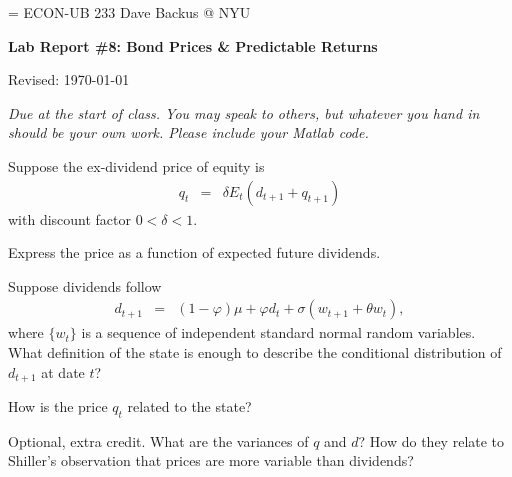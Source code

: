 \documentclass[11pt]{exam}
\begin{document}
\parskip=\bigskipamount
\parindent=0.0in
\thispagestyle{empty}
{\large ECON-UB 233 \hfill Dave Backus @ NYU}

\bigskip\bigskip
\centerline{\Large \bf Lab Report \#8:  Bond Prices \& Predictable Returns}
\centerline{Revised: \today}

\bigskip
{\it Due at the start of class.
You may speak to others, but whatever you hand in should be your own work.
Please include your Matlab code.}


\begin{questions}
Suppose the ex-dividend price of equity is
\begin{eqnarray}
    q_t &=& \delta E_t \left( d_{t+1} + q_{t+1} \right)
    \label{eq:forward}
\end{eqnarray}
with discount factor $ 0 < \delta < 1 $.
\begin{parts}
\item Express the price as a function of expected future dividends.
\item Suppose dividends follow
\begin{eqnarray*}
    d_{t+1} &=& (1-\varphi) \mu + \varphi d_t + \sigma( w_{t+1} + \theta w_t ) ,
\end{eqnarray*}
where $\{ w_t \} $ is a sequence of independent standard normal random variables.
What definition of the state is enough to describe the conditional distribution of $d_{t+1}$ at date $t$?
\item How is the price $q_t$ related to the state?
\item Optional, extra credit.  What are the variances of $q$ and $d$?
How do they relate to Shiller's observation that prices are more variable
than dividends?
\end{parts}


\end{questions}
\end{document}
